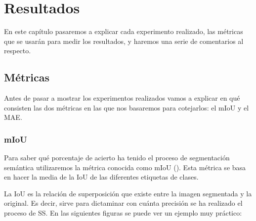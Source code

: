 \chapter{Resultados}
\label{ch:res}

En este capítulo pasaremos a explicar cada experimento realizado, las métricas que se usarán para medir los resultados, y haremos una serie de comentarios al respecto.

\section{Métricas}

Antes de pasar a mostrar los experimentos realizados vamos a explicar en qué consisten las dos métricas en las que nos basaremos para cotejarlos: el \ac{mIoU} y el \ac{MAE}.

\subsection{mIoU}

Para saber qué porcentaje de acierto ha tenido el proceso de segmentación semántica utilizaremos la métrica conocida como \ac{mIoU} (\cite{miou-iou}). Esta métrica se basa en hacer la media de la \ac{IoU} de las diferentes etiquetas de clases.

La \ac{IoU} es la relación de superposición que existe entre la imagen segmentada y la original. Es decir, sirve para dictaminar con cuánta precisión se ha realizado el proceso de \ac{SS}. En las siguientes figuras se puede ver un ejemplo muy práctico:

